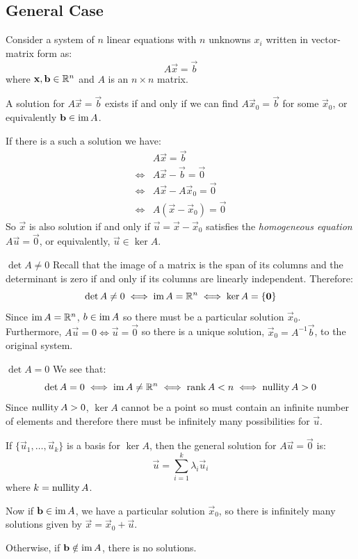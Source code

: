 \documentclass[../main.tex]{subfiles}
\begin{document}
\subsection{General Case}
Consider a system of $n$ linear equations with $n$ unknowns $x_i$ written in vector-matrix form as:
\[
  A\vec{x} = \vec{b}
\]
where $\mathbf{\bm{x}}, \mathbf{\bm{b}} \in \mathbb{R}^{n}$ and $A$ is an $n \times n$ matrix.

A solution for $A\vec{x} = \vec{b}$ exists if and only if we can find $A\vec{x}_0 = \vec{b}$ for some $\vec{x}_0$, or equivalently $\mathbf{\bm{b}} \in \operatorname{im} A$.

If there is a such a solution we have:
\begin{align*}
  &A\vec{x} = \vec{b} \\
  \iff& A\vec{x} - \vec{b} = \vec{0} \\
  \iff& A\vec{x} - A\vec{x}_0 = \vec{0} \\
  \iff& A(\vec{x} - \vec{x}_0) = \vec{0}
\end{align*}
So $\vec{x}$ is also solution if and only if $\vec{u} = \vec{x} - \vec{x}_0$ satisfies the \textit{homogeneous equation} $A\vec{u} = \vec{0}$, or equivalently, $\vec{u} \in \ker A$.
\begin{proofcases}
  \begin{case}{$\det A \neq 0$}
    Recall that the image of a matrix is the span of its columns and the determinant is zero if and only if its columns are linearly independent.
    Therefore:
    \[
      \det A \neq 0 \iff \operatorname{im} A = \mathbb{R}^{n} \iff \ker A = \{\mathbf{\bm{0}}\}
    \]
    Since $\operatorname{im} A = \mathbb{R}^{n}$, $b \in \operatorname{im} A$ so there must be a particular solution $\vec{x}_0$.
    Furthermore, $A\vec{u} = 0 \iff \vec{u} = \vec{0}$ so there is a unique solution, $\vec{x}_0 = A^{-1} \vec{b}$, to the original system.
  \end{case}
  \begin{case}{$\det A = 0$}
    We see that:
    \[
      \det A = 0 \iff \operatorname{im} A \neq \mathbb{R}^{n} \iff \operatorname{rank} A < n \iff \operatorname{nullity} A > 0
    \]
    Since $\operatorname{nullity} A > 0$, $\ker A$ cannot be a point so must contain an infinite number of elements and therefore there must be infinitely many possibilities for $\vec{u}$.

    If $\{\vec{u}_1, \ldots, \vec{u}_k\}$ is a basis for $\ker A$, then the general solution for $A \vec{u} = \vec{0}$ is:
    \[
      \vec{u} = \sum_{i = 1}^{k} \lambda_i \vec{u}_i
    \]
    where $k = \operatorname{nullity} A$.

    Now if $\mathbf{\bm{b}} \in \operatorname{im} A$, we have a particular solution $\vec{x}_0$, so there is infinitely many solutions given by $\vec{x} = \vec{x}_0 + \vec{u}$.

    Otherwise, if $\mathbf{\bm{b}} \notin \operatorname{im} A$, there is no solutions.
  \end{case}
\end{proofcases}
\end{document}
